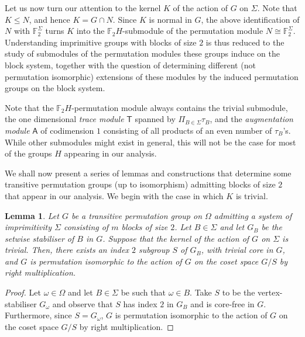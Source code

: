 \documentclass[a4paper]{amsart}
\newcommand{\FF}{\mathbb{F}}
\newcommand{\A}{\mathsf{A}}
\newtheorem{lemma}[theorem]{Lemma}
\theoremstyle{definition}
\begin{document}
Let us now turn our attention to the kernel $K$ of the action of $G$ on $\Sigma$. Note that $K\le N$, and hence $K = G \cap N$. Since $K$ is normal in $G$, the above identification of $N$ with $\FF_2^\Sigma$ turns $K$ into the $\FF_2H$-submodule of the permutation module $N \cong \FF_2^\Sigma$. Understanding imprimitive groups with blocks of size $2$ is thus reduced to the study of submodules of the permutation modules these groups induce on the block system, together with the question of determining different (not permutation isomorphic) extensions of these modules by the induced permutation groups on the block system.

Note that the $\FF_2H$-permutation module always contains the trivial submodule, the one dimensional {\em trace module} $\mathsf{T}$ spanned by $\Pi_{B \in \Sigma} \tau_B$, and the {\em augmentation module} $\A$ of codimension $1$ consisting of all products of an even number of $\tau_B$'s. While other submodules might exist in general, 
 this will not be the case for most of the groups $H$ appearing in our analysis.

We shall now present a series of lemmas and constructions that determine some transitive permutation groups (up to isomorphism) admitting blocks of size $2$ that appear in our analysis. 
We begin with the case in which $K$ is trivial.

\begin{lemma}
 \label{lem:trivialK}
    Let $G$ be a transitive permutation group on  $\Omega$ admitting a system of imprimitivity $\Sigma$ consisting of $m$ blocks of size $2$. Let $B \in \Sigma$ and let $G_B$ be the setwise stabiliser of $B$ in $G$. 
    Suppose that the kernel of the action of $G$ on $\Sigma$ is trivial.
    Then, there exists an index $2$ subgroup $S$ of $G_B$, with trivial core in $G$, 
    and $G$ is permutation isomorphic to the action of $G$ on the coset space $G/S$ by right multiplication.
\end{lemma}

\begin{proof}
    Let $\omega \in \Omega$ and let $B \in \Sigma$ be such that $\omega \in B$. Take $S$ to be the vertex-stabiliser $G_\omega$ and observe that $S$ has index $2$ in $G_B$ and is core-free in $G$. Furthermore, since $S = G_\omega$, $G$ is permutation isomorphic to the action of $G$ on the coset space $G/S$ by right multiplication.
\end{proof}
\end{document}
